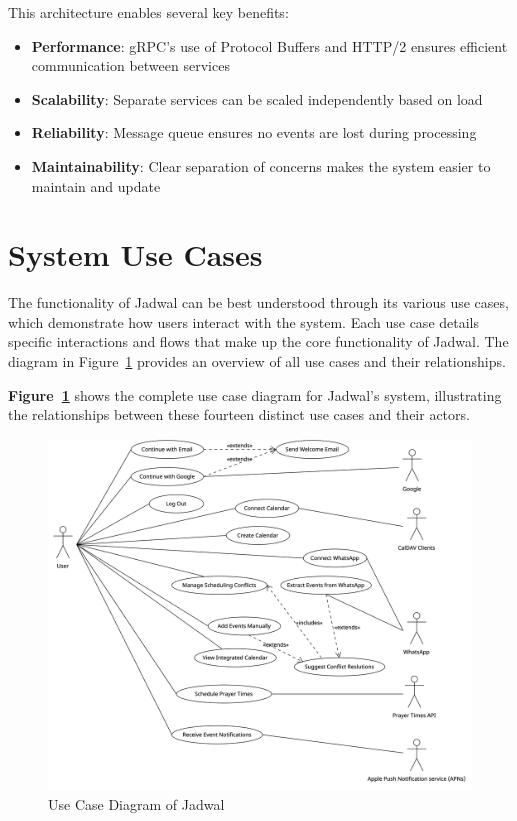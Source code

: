 \documentclass[12pt,a4paper,twoside]{report}
\begin{document}
This architecture enables several key benefits:

\begin{itemize}
    \item \textbf{Performance}: gRPC's use of Protocol Buffers and HTTP/2 ensures efficient communication between services
    \item \textbf{Scalability}: Separate services can be scaled independently based on load
    \item \textbf{Reliability}: Message queue ensures no events are lost during processing
    \item \textbf{Maintainability}: Clear separation of concerns makes the system easier to maintain and update
\end{itemize}

\section{System Use Cases}
The functionality of Jadwal can be best understood through its various use cases, which demonstrate how users interact with the system. Each use case details specific interactions and flows that make up the core functionality of Jadwal. The diagram in Figure~\ref{fig:use-case-diagram} provides an overview of all use cases and their relationships.

\textbf{Figure~\ref{fig:use-case-diagram}} shows the complete use case diagram for Jadwal's system, illustrating the relationships between these fourteen distinct use cases and their actors.

\begin{figure}[!h]
    \centering
    \includegraphics[width=\textwidth]{images/use-case-diagram.png}
    \caption{Use Case Diagram of Jadwal}
    \label{fig:use-case-diagram}
\end{figure}
\end{document}
